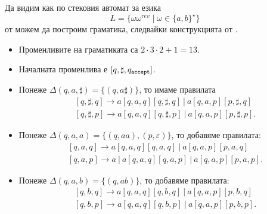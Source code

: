 \begin{example}
  Да видим как по стековия автомат за езика 
  \[L = \{\omega\omega^{rev} \mid \omega \in \{a,b\}^\star\}\]
  от  можем да построим граматика, следвайки конструкцията от .

  \begin{itemize}
  \item
    Променливите на граматиката са $2 \cdot 3 \cdot 2 + 1 = 13$.
  \item
    Началната променлива е $[q,\sharp,q_{\texttt{accept}}]$.
  \item
    Понеже $\Delta(q, a, \sharp) = \{(q, a\sharp)\}$, то имаме правилата
    \begin{align*}
      & [q, \sharp, q] \to a[q,a,q][q,\sharp,q]\ |\ a[q,a,p][p,\sharp,q]\\
      & [q, \sharp, p] \to a[q,a,q][q,\sharp,p]\ |\ a[q,a,p][p,\sharp,p].
    \end{align*}
  \item
    Понеже $\Delta(q, a, a) = \{(q, aa), (p, \varepsilon)\}$, то добавяме правилата:
    \begin{align*}
      & [q,a,q] \to a[q, a, q][q,a,q]\ |\ a[q,a,p][p,a,q]\\
      & [q,a,p] \to a\ |\ a[q, a, q][q,a,p]\ |\ a[q,a,p][p,a,p].
    \end{align*}
  \item
    Понеже $\Delta(q, a, b) = \{(q, ab)\}$, то добавяме правилата:
    \begin{align*}
      & [q,b,q] \to a[q,a,q][q,b,q]\ |\ a[q,a,p][p,b,q]\\
      & [q,b,p] \to a[q,a,q][q,b,p]\ |\ a[q,a,p][p,b,p].
    \end{align*}
  \end{itemize}
\end{example}

